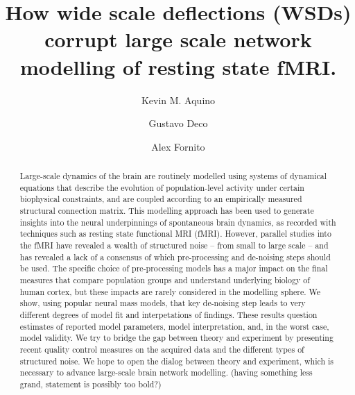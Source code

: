 \documentclass[oneside]{zHenriquesLab-StyleBioRxiv}
\begin{document}
\title{How wide scale deflections (WSDs) corrupt large scale network modelling of resting state fMRI.}

\author[1,*]{Kevin M. Aquino}
\author[1,2]{Gustavo Deco}
\author[1]{Alex Fornito}


\maketitle

\begin{abstract}
Large-scale dynamics of the brain are routinely modelled using systems of dynamical equations that describe the evolution of population-level activity under certain biophysical constraints, and are coupled according to an empirically measured structural connection matrix. This modelling approach has been used to generate insights into the neural underpinnings of spontaneous brain dynamics, as recorded with techniques such as resting state functional MRI (fMRI).
However, parallel studies into the fMRI have revealed a wealth of structured noise – from small to large scale – and has revealed a lack of a consensus of which pre-processing and de-noising steps should be used. 
The specific choice of pre-processing models has a major impact on the final measures that compare population groups and understand underlying biology of human cortex, but these impacts are rarely considered in the modelling sphere. 
We show, using popular neural mass models, that key de-noising step leads to very different degrees of model fit and interpetations of findings.
These results question estimates of reported model parameters, model interpretation, and, in the worst case, model validity. 
We try to bridge the gap between theory and experiment by presenting recent quality control measures on the acquired data and the different types of structured noise. 
We hope to open the dialog between theory and experiment, which is necessary to advance large-scale brain network modelling. (having something less grand, statement is possibly too bold?)
\end{abstract}
\end{document}

